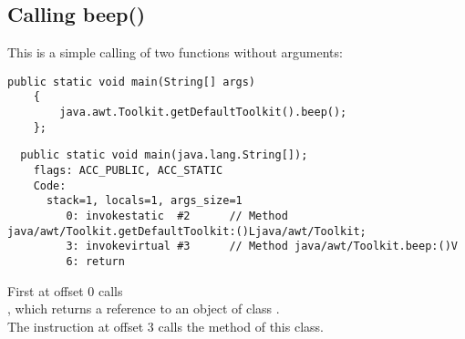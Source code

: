 \subsection{Calling beep()}

This is a simple calling of two functions without arguments:


\begin{lstlisting}[style=customjava]
	public static void main(String[] args)
	{
		java.awt.Toolkit.getDefaultToolkit().beep();
	};
\end{lstlisting}

\begin{lstlisting}
  public static void main(java.lang.String[]);
    flags: ACC_PUBLIC, ACC_STATIC
    Code:
      stack=1, locals=1, args_size=1
         0: invokestatic  #2      // Method java/awt/Toolkit.getDefaultToolkit:()Ljava/awt/Toolkit;
         3: invokevirtual #3      // Method java/awt/Toolkit.beep:()V
         6: return        
\end{lstlisting}

First  at offset 0 calls\\
, 
which returns a reference to an object of class .\\
The  instruction at offset 3 calls the  method of this class.

